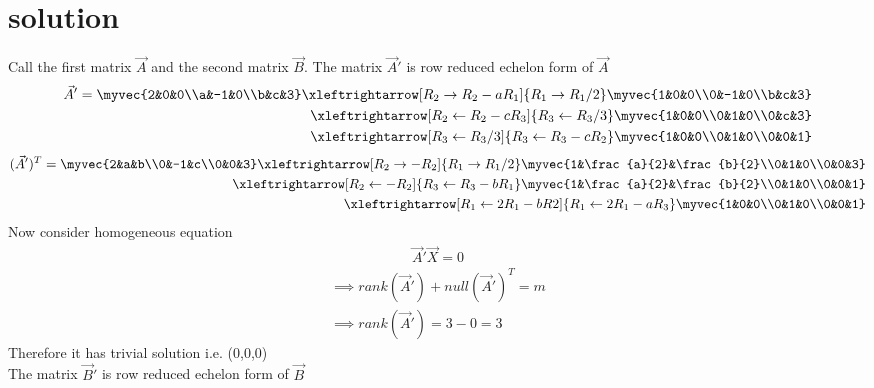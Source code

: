 \documentclass[journal,12pt,twocolumn]{IEEEtran}
\begin{document}
 \section{solution}
 Call the first matrix $\vec{A}$ and the second matrix $\vec{B}$. The matrix $\vec{A}{'}$ is  row reduced echelon form of $\vec{A}$  
 \begin{align}
     \vec{A}{'}=\myvec{2&0&0\\a&-1&0\\b&c&3}
     \xleftrightarrow[R_2\rightarrow R_2-aR_1]{R_1\rightarrow R_1/2}\myvec{1&0&0\\0&-1&0\\b&c&3}\\
     \xleftrightarrow[R_2\leftarrow R_2-cR_3]{R_3\leftarrow R_3/3}
     \myvec{1&0&0\\0&1&0\\0&c&3}\\
     \xleftrightarrow[R_3\leftarrow R_3/3]{R_3\leftarrow R_3-cR_2}\myvec{1&0&0\\0&1&0\\0&0&1}
 \end{align}
  \begin{align}
     (\vec{A}{'})^{T}=\myvec{2&a&b\\0&-1&c\\0&0&3}
     \xleftrightarrow[R_2\rightarrow-R_2]{R_1\rightarrow R_1/2}\myvec{1&\frac{a}{2}&\frac{b}{2}\\0&1&0\\0&0&3}\\
     \xleftrightarrow[R_2\leftarrow-R_2]{R_3\leftarrow R_3-bR_1}
     \myvec{1&\frac{a}{2}&\frac{b}{2}\\0&1&0\\0&0&1}\\
     \xleftrightarrow[R_1\leftarrow 2R_1-bR2]{R_1\leftarrow 2R_1-aR_3}\myvec{1&0&0\\0&1&0\\0&0&1}
 \end{align}
 Now consider homogeneous equation 
 \begin{align}
   \vec{A}{'}\vec{X}=0
   \end{align}
   \begin{align}
   \implies rank(\vec{A}{'})+null(\vec{A}{'})^{T}=m\\
   \implies rank(\vec{A}{'}) = 3-0=3
   \end{align}
   Therefore it has trivial solution i.e. (0,0,0)\\
   The matrix $\vec{B}{'}$ is row reduced echelon form of $\vec{B}$  
\end{document}
